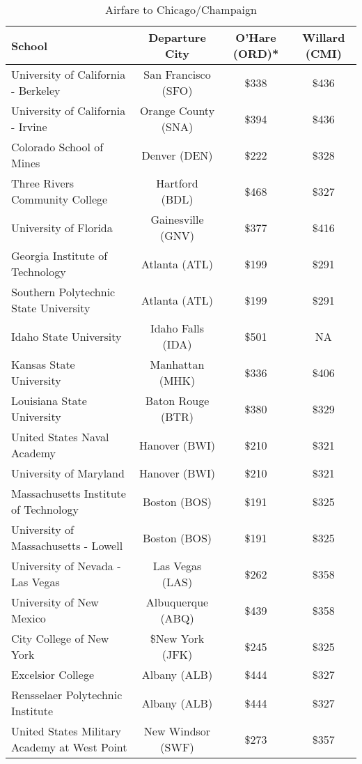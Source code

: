 


\begin{table}[H]
\caption{Airfare to Chicago/Champaign}
\label{table:airfare}
   \begin{tabular}{lccc}
   	\hline\hline
    \textbf{School} & \textbf{Departure City} & \textbf{O'Hare (ORD)*} & \textbf{Willard (CMI)} \\
    \hline\hline
    University of California - Berkeley & San Francisco (SFO) & $\$$338 & $\$$436 \\
    University of California - Irvine&Orange County (SNA)&$\$$394&$\$$436\\
    Colorado School of Mines & Denver (DEN) & $\$$222 & $\$$328 \\
    Three Rivers Community College & Hartford (BDL) & $\$$468 & $\$$327 \\ 
    University of Florida & Gainesville (GNV)& $\$$377 & $\$$416 \\
    Georgia Institute of Technology & Atlanta (ATL)& $\$$199 & $\$$291 \\
    Southern Polytechnic State University & Atlanta (ATL) & $\$$199 & $\$$291 \\
    Idaho State University & Idaho Falls (IDA) & $\$$501 & NA \\
    Kansas State University & Manhattan (MHK) & $\$$336 & $\$$406 \\ 
    Louisiana State University & Baton Rouge (BTR) & $\$$380 & $\$$329 \\
    United States Naval Academy & Hanover (BWI) & $\$$210 & $\$$321 \\  
    University of Maryland & Hanover (BWI)&$\$$210 &$\$$321 \\ 
    Massachusetts Institute of Technology & Boston (BOS)&$\$$191 &$\$$325 \\ 
    University of Massachusetts - Lowell &Boston (BOS) &$\$$191 &$\$$325 \\
    University of Nevada - Las Vegas & Las Vegas (LAS)& $\$$262 &$\$$358 \\ 
    University of New Mexico &Albuquerque (ABQ) &$\$$439 &$\$$358 \\ 
    City College of New York &\$New York (JFK) &$\$$245 &$\$$325 \\
    Excelsior College & Albany (ALB) &$\$$444 &$\$$327 \\ 
    Rensselaer Polytechnic Institute & Albany (ALB)&$\$$444 &$\$$327 \\ 
    United States Military Academy at West Point&New Windsor (SWF)&$\$$273 &$\$$357 \\ 

\end{tabular}
\end{table}
